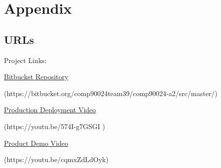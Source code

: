 \section{Appendix}

\subsection{URLs}
Project Links: 

\href{https://bitbucket.org/comp90024team39/comp90024-a2/src/master/}{Bitbucket Repository}

(https://bitbucket.org/comp90024team39/comp90024-a2/src/master/)

\href{https://youtu.be/574I-g7GSGI }{Production Deployment Video} 

(https://youtu.be/574I-g7GSGI )

\href{https://youtu.be/cqmxZdLdOyk}{Product Demo Video} 

(https://youtu.be/cqmxZdLdOyk) \\

